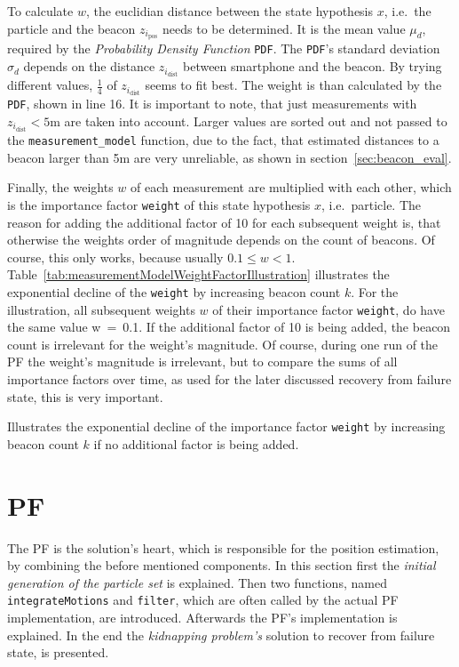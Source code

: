 

To calculate $w$, the euclidian distance between the state hypothesis $x$, i.e.\ the particle and  the beacon $z_{i_\text{pos}}$ needs to be determined. It is the mean value $\mu_d$, required by the \emph{Probability Density Function} \texttt{PDF}. The \texttt{PDF}'s standard deviation $\sigma_d$ depends on the distance $z_{i_\text{dist}}$ between smartphone and the beacon. By trying different values, $\frac{1}{4}$ of $z_{i_\text{dist}}$ seems to fit best. The weight is than calculated by the \texttt{PDF}, shown in line 16. It is important to note, that just measurements with $z_{i_\text{dist}} < 5\text{m}$ are taken into account. Larger values are sorted out and not passed to the \texttt{measurement\_model} function, due to the fact, that estimated distances to a beacon larger than 5m are very unreliable, as shown in section~\ref{sec:beacon_eval}.

Finally, the weights $w$ of each measurement are multiplied with each other, which is the importance factor \texttt{weight} of this state hypothesis $x$, i.e.\ particle. The reason for adding the additional factor of 10 for each subsequent weight is, that otherwise the weights order of magnitude depends on the count of beacons. Of course, this only works, because usually $0.1 \leq w < 1$. Table~\ref{tab:measurementModelWeightFactorIllustration} illustrates the exponential decline of the \texttt{weight} by increasing beacon count $k$. For the illustration, all subsequent weights $w$ of their importance factor \texttt{weight}, do have the same value w~=~0.1. If the additional factor of 10 is being added, the beacon count is irrelevant for the weight's magnitude. Of course, during one run of the \acl{PF} the weight's magnitude is irrelevant, but to compare the sums of all importance factors over time, as used for the later discussed recovery from failure state, this is very important.

\begin{table}
	
	\caption{Illustrates the exponential decline of the importance factor \texttt{weight} by increasing beacon count $k$ if no additional factor is being added.}
	\label{tab:measurementModelWeightFactorIllustration}
\end{table}


\section{\acl{PF}}\label{sec:algo_pf}
The \acl{PF} is the solution's heart, which is responsible for the position estimation, by combining the before mentioned components. In this section first the \emph{initial generation of the particle set} is explained. Then two functions, named \texttt{integrateMotions} and \texttt{filter}, which are often called by the actual \ac{PF} implementation, are introduced. Afterwards the \ac{PF}'s implementation is explained. In the end the \emph{kidnapping problem's} solution to recover from failure state, is presented.


